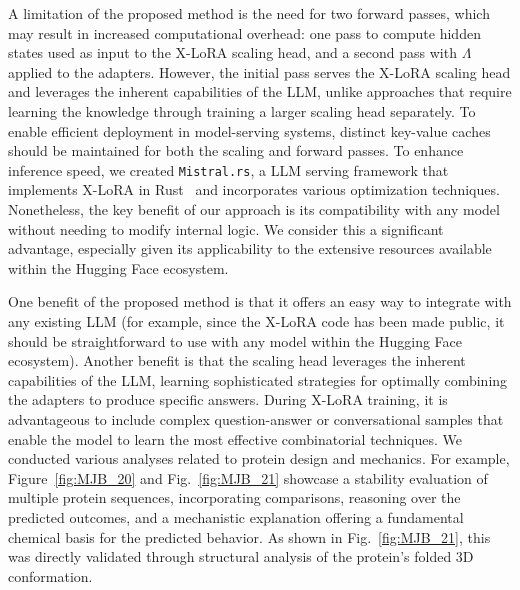 A limitation of the proposed method is the need for two forward passes, which may result in increased computational overhead: one pass to compute hidden states used as input to the X-LoRA scaling head, and a second pass with $\Lambda$ applied to the adapters. However, the initial pass serves the X-LoRA scaling head and leverages the inherent capabilities of the LLM, unlike approaches that require learning the knowledge through training a larger scaling head separately. To enable efficient deployment in model-serving systems, distinct key-value caches should be maintained for both the scaling and forward passes. To enhance inference speed, we created \texttt{Mistral.rs}, a LLM serving framework that implements X-LoRA in Rust~\cite{matsakis2014rust} and incorporates various optimization techniques. Nonetheless, the key benefit of our approach is its compatibility with any model without needing to modify internal logic. We consider this a significant advantage, especially given its applicability to the extensive resources available within the Hugging Face ecosystem.

One benefit of the proposed method is that it offers an easy way to integrate with any existing LLM (for example, since the X-LoRA code has been made public, it should be straightforward to use with any model within the Hugging Face ecosystem). Another benefit is that the scaling head leverages the inherent capabilities of the LLM, learning sophisticated strategies for optimally combining the adapters to produce specific answers. During X-LoRA training, it is advantageous to include complex question-answer or conversational samples that enable the model to learn the most effective combinatorial techniques. We conducted various analyses related to protein design and mechanics. For example, Figure~\ref{fig:MJB_20} and Fig.~\ref{fig:MJB_21} showcase a stability evaluation of multiple protein sequences, incorporating comparisons, reasoning over the predicted outcomes, and a mechanistic explanation offering a fundamental chemical basis for the predicted behavior. As shown in Fig.~\ref{fig:MJB_21}, this was directly validated through structural analysis of the protein’s folded 3D conformation.

